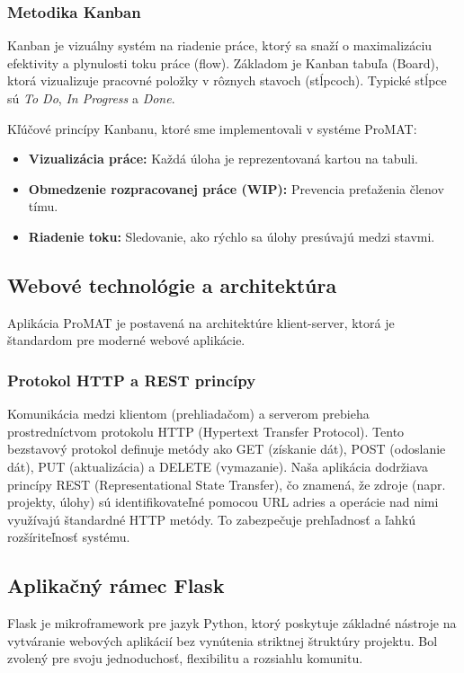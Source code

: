\documentclass[12pt, a4paper]{article}
\begin{document}
\begin{titlepage}
\subsubsection{Metodika Kanban}
Kanban je vizuálny systém na riadenie práce, ktorý sa snaží o maximalizáciu efektivity a plynulosti toku práce (flow). Základom je Kanban tabuľa (Board), ktorá vizualizuje pracovné položky v rôznych stavoch (stĺpcoch). Typické stĺpce sú \textit{To Do}, \textit{In Progress} a \textit{Done}.

Kľúčové princípy Kanbanu, ktoré sme implementovali v systéme ProMAT:
\begin{itemize}
    \item \textbf{Vizualizácia práce:} Každá úloha je reprezentovaná kartou na tabuli.
    \item \textbf{Obmedzenie rozpracovanej práce (WIP):} Prevencia preťaženia členov tímu.
    \item \textbf{Riadenie toku:} Sledovanie, ako rýchlo sa úlohy presúvajú medzi stavmi.
\end{itemize}

\subsection{Webové technológie a architektúra}
Aplikácia ProMAT je postavená na architektúre klient-server, ktorá je štandardom pre moderné webové aplikácie.

\subsubsection{Protokol HTTP a REST princípy}
Komunikácia medzi klientom (prehliadačom) a serverom prebieha prostredníctvom protokolu HTTP (Hypertext Transfer Protocol). Tento bezstavový protokol definuje metódy ako GET (získanie dát), POST (odoslanie dát), PUT (aktualizácia) a DELETE (vymazanie).
Naša aplikácia dodržiava princípy REST (Representational State Transfer), čo znamená, že zdroje (napr. projekty, úlohy) sú identifikovateľné pomocou URL adries a operácie nad nimi využívajú štandardné HTTP metódy. To zabezpečuje prehľadnosť a ľahkú rozšíriteľnosť systému.

\subsection{Aplikačný rámec Flask}
Flask je mikroframework pre jazyk Python, ktorý poskytuje základné nástroje na vytváranie webových aplikácií bez vynútenia striktnej štruktúry projektu. Bol zvolený pre svoju jednoduchosť, flexibilitu a rozsiahlu komunitu.


\end{titlepage}
\end{document}
